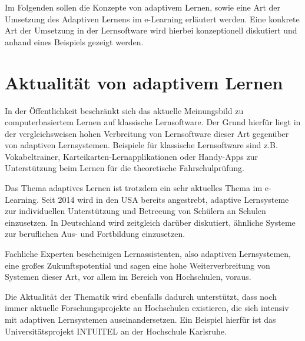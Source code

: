Im Folgenden sollen die Konzepte von adaptivem Lernen, sowie eine Art der
Umsetzung des Adaptiven Lernens im e-Learning erläutert werden.
Eine konkrete Art der Umsetzung in der Lernsoftware wird hierbei konzeptionell
diskutiert und anhand eines Beispiels gezeigt werden.

\section{Aktualität von adaptivem Lernen}
In der Öffentlichkeit beschränkt sich das aktuelle Meinungsbild zu computerbasiertem Lernen
auf klassische Lernsoftware. Der Grund hierfür liegt in der vergleichsweisen hohen Verbreitung
von Lernsoftware dieser Art gegenüber von adaptiven Lernsystemen. Beispiele für klassische Lernsoftware
sind z.B. Vokabeltrainer, Karteikarten-Lernapplikationen oder Handy-Apps zur Unterstützung beim Lernen für die theoretische
Fahrschulprüfung.

Das Thema adaptives Lernen ist trotzdem ein sehr aktuelles Thema im e-Learning.
Seit 2014 wird in den USA bereits angestrebt, adaptive Lernsysteme zur
individuellen Unterstützung und Betreeung von Schülern an Schulen einzusetzen.
In Deutschland wird zeitgleich darüber diskutiert, ähnliche Systeme zur beruflichen Aus- und Fortbildung
einzusetzen.
\cite[S. 2, S. 8]{mmb2014}

Fachliche Experten bescheinigen Lernassistenten, also adaptiven Lernsystemen, eine großes Zukunftspotential
und sagen eine hohe Weiterverbreitung von Systemen dieser Art, vor allem im Bereich von Hochschulen, voraus.
\cite[S. 2]{mmb2014}

Die Aktualität der Thematik wird ebenfalls dadurch unterstützt, dass noch immer aktuelle
Forschungsprojekte an Hochschulen existieren, die sich intensiv mit adaptiven Lernsystemen auseinandersetzen.
Ein Beispiel hierfür ist das Universitätsprojekt INTUITEL an der Hochschule Karlsruhe.
\cite[S. 2]{mmb2014}
